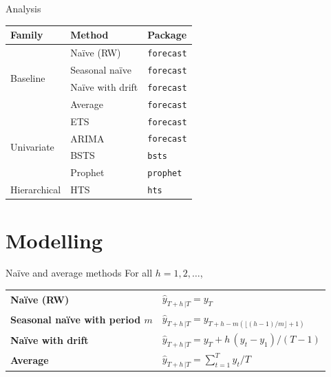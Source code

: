 \documentclass[12pt,aspectratio=169]{beamer}
\begin{document}
\begin{frame}{Analysis}
    \centering%
    \begin{tabular}{lll}
        \toprule
        \textbf{Family}               & \textbf{Method}  & \textbf{Package} \\
        \midrule
        \multirow{4}{*}{Baseline}     & Naïve (RW)       & \texttt{forecast} \\
                                      & Seasonal naïve   & \texttt{forecast} \\
                                      & Naïve with drift & \texttt{forecast} \\
                                      & Average          & \texttt{forecast} \\
        \midrule
        \multirow{4}{*}{Univariate}   & ETS              & \texttt{forecast} \\
                                      & ARIMA            & \texttt{forecast} \\
                                      & BSTS             & \texttt{bsts} \\
                                      & Prophet          & \texttt{prophet} \\
        \midrule
        \multirow{1}{*}{Hierarchical} & HTS              & \texttt{hts} \\
        \bottomrule
    \end{tabular}
\end{frame}

\section{Modelling}

\begin{frame}{Naïve and average methods}
    For all $h = 1, 2, \ldots$,
    \begin{center}
        \renewcommand{\arraystretch}{1.5}%
        \begin{tabular}{ll}
            \toprule
            \textbf{Naïve (RW)}                     & $\hat{y}_{T + h\,| T} = y_{T}$ \\
            \textbf{Seasonal naïve with period $m$} & $\hat{y}_{T + h\,| T} = y_{T+h-m(\lfloor (h-1)/m \rfloor+1)}$ \\
            \textbf{Naïve with drift}               & $\hat{y}_{T + h\,| T} = y_{T} + h\,(y_{t} - y_{1}) / (T - 1)$ \\
            \textbf{Average}                        & $\hat{y}_{T + h\,| T} = \sum_{t = 1}^{T} y_{t} / T$ \\
            \bottomrule
        \end{tabular}
    \end{center}
\end{frame}
\end{document}
